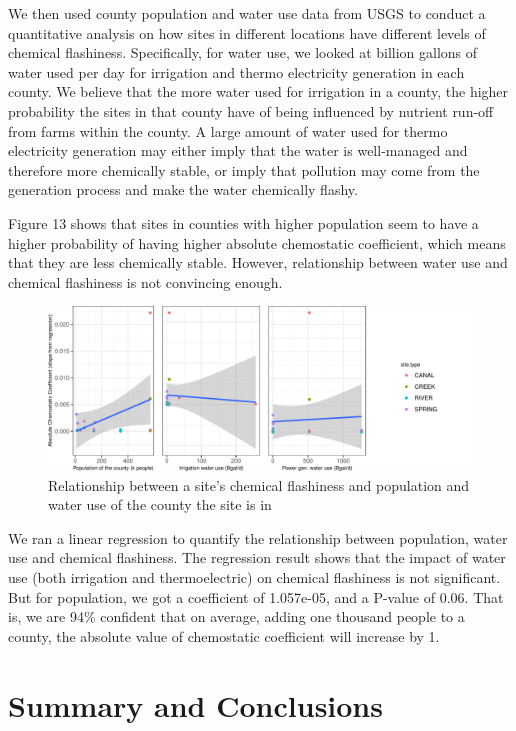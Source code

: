 \documentclass[12pt,]{article}
\begin{document}
We then used county population and water use data from USGS to conduct a
quantitative analysis on how sites in different locations have different
levels of chemical flashiness. Specifically, for water use, we looked at
billion gallons of water used per day for irrigation and thermo
electricity generation in each county. We believe that the more water
used for irrigation in a county, the higher probability the sites in
that county have of being influenced by nutrient run-off from farms
within the county. A large amount of water used for thermo electricity
generation may either imply that the water is well-managed and therefore
more chemically stable, or imply that pollution may come from the
generation process and make the water chemically flashy.

Figure 13 shows that sites in counties with higher population seem to
have a higher probability of having higher absolute chemostatic
coefficient, which means that they are less chemically stable. However,
relationship between water use and chemical flashiness is not convincing
enough.

\begin{figure}
\centering
\includegraphics{Final-Project-Report_files/figure-latex/unnamed-chunk-18-1.pdf}
\caption{Relationship between a site's chemical flashiness and
population and water use of the county the site is in}
\end{figure}

We ran a linear regression to quantify the relationship between
population, water use and chemical flashiness. The regression result
shows that the impact of water use (both irrigation and thermoelectric)
on chemical flashiness is not significant. But for population, we got a
coefficient of 1.057e-05, and a P-value of 0.06. That is, we are 94\%
confident that on average, adding one thousand people to a county, the
absolute value of chemostatic coefficient will increase by 1.

\newpage

\hypertarget{summary-and-conclusions}{%
\section{Summary and Conclusions}\label{summary-and-conclusions}}
\end{document}
